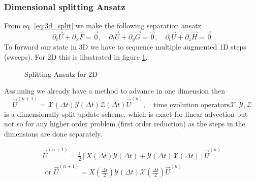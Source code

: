 \subsubsection{Dimensional splitting Ansatz}
From eq. \ref{eq:3d_split} we make the following separation ansatz
\begin{equation}
    \partial_t \vec{U} + \partial_x \vec{F} = \vec{0}, \quad \partial_t \vec{U} + \partial_y \vec{G} = \vec{0}, \quad \partial_t \vec{U} + \partial_z \vec{H} = \vec{0}
\end{equation}
To forward our state in 3D we have to sequence multiple augmented 1D steps (sweeps). For 2D this
is illustrated in figure \ref{fig:2d_sweep}.

\begin{figure}[htb!]
    \centering
    
    \caption{Splitting Ansatz for 2D}
    \label{fig:2d_sweep}
\end{figure}

Assuming we already have a method to advance in one dimension then
\begin{equation}
    \vec{U}^{(n+1)} = \mathcal{X}(\Delta t) \mathcal{Y}(\Delta t) \mathcal{Z}(\Delta t) \vec{U}^{(n)}, \quad \text{time evolution operators} \mathcal{X}, \mathcal{Y}, \mathcal{Z}
\end{equation}
is a dimensionally split update scheme, which is exact for linear advection but
not so for any higher order problem (first order reduction) as the steps
in the dimensions are done separately.

\begin{equation}
    \begin{gathered}
    \vec{U}^{(n+1)}=\frac{1}{2}[X(\Delta t) \mathcal{Y}(\Delta t)+\mathcal{Y}(\Delta t) \mathcal{X}(\Delta t)] \vec{U}^{(n)} \\
    \text { or } \vec{U}^{(n+1)}=X\left(\frac{\Delta t}{2}\right) \mathcal{Y}(\Delta t) \mathcal{X}\left(\frac{\Delta t}{2}\right) \vec{U}^{(n)}
    \end{gathered}
\end{equation}

